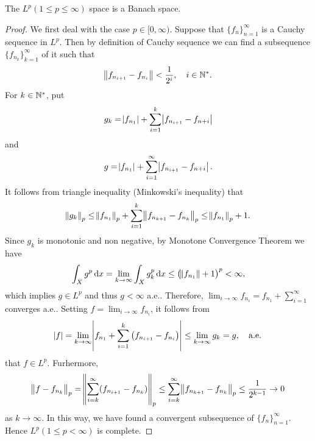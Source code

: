 \begin{thm}
The $L^p (1 \le p \le \infty)$ space is a Banach space.  
\end{thm}
\begin{proof}
We first deal with the case $p \in [0, \infty)$. 
Suppose that $\{ f_n \}_{n=1}^{\infty}$ is a Cauchy sequence in $L^p$. 
Then by definition of Cauchy sequence we can find a subsequence 
$\{ f_{n_k} \}_{k=1}^{\infty}$ of it such that 
\begin{equation*}
    \norm{f_{n_{i+1}} - f_{n_i}} < \frac{1}{2^i}, \quad i \in \mathbb{N}^\ast.
\end{equation*}
For $k \in \mathbb{N}^\ast$, put 
\begin{equation*}
    g_k = \abs{f_{n_1}} + \sum_{i=1}^{k} \abs{f_{n_{i+1}} - f_{n+i}} 
\end{equation*}
and 
\begin{equation*}
    g = \abs{f_{n_1}} + \sum_{i=1}^{\infty} \abs{f_{n_{i+1}} - f_{n+i}}. 
\end{equation*}
It follows from triangle inequality (Minkowski's inequality) that 
\begin{equation*}
    \norm{g_k}_p \le \norm{f_{n_1}}_p + 
        \sum_{i=1}^{k} \norm{f_{n_{k+1}} - f_{n_k}}_p 
    \le \norm{f_{n_1}}_p + 1. 
\end{equation*}
Since $g_k$ is monotonic and non negative, by Monotone Convergence Theorem 
we have 
\begin{equation*}
    \int_{X} g^p \mathop{}\!\mathrm{d} x = \lim_{k \to \infty} \int_{X} g_k^p \mathop{}\!\mathrm{d} x 
    \le \left( \norm{f_{n_1}} + 1 \right) ^p < \infty, 
\end{equation*}
which implies $g \in L^p$ and thus $g < \infty$ a.e.. 
Therefore, $\lim_{i \to \infty} f_{n_i} = f_{n_1} + \sum_{i=1}^{\infty}$ 
converges a.e.. 
Setting $f =  \lim_{i \to \infty} f_{n_i}$, it follows from 
\begin{equation*}
    \abs{f} = \lim_{k \to \infty} \abs{f_{n_1} 
        + \sum_{i=1}^{k} \left( f_{n_{i+1}} - f_{n_i} \right)} 
    \le \lim_{k \to \infty} g_k = g, \quad \text{a.e.}
\end{equation*}
that $f \in L^p$. 
Furhermore, 
\begin{equation*}
    \norm{f - f_{n_k}}_p = \norm{\sum_{i=k}^{\infty} 
        (f_{n_{i+1}} - f_{n_k})}_p 
    \le \sum_{i=k}^{\infty} \norm{ f_{n_{k+1}} - f_{n_k}}_p 
    \le \frac{1}{2^{k-1}} \to 0
\end{equation*}
as $k \to \infty$. 
In this way, we have found a convergent subsequence of $\{ f_n \}_{n=1}
^{\infty}$. 
Hence $L^p (1 \le p < \infty)$ is complete. 


\end{proof}

